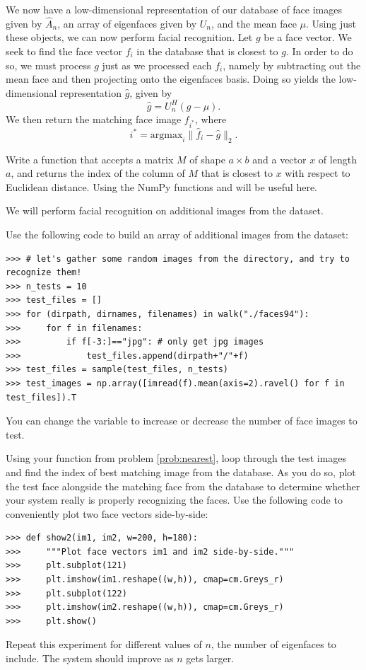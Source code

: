 We now have a low-dimensional representation of our database of face images given by $\hat{A}_n$, an array of eigenfaces given by $U_n$,
and the mean face $\mu$. Using just these objects, we can now perform facial recognition.
Let $g$ be a face vector.
We seek to find the face vector $f_i$ in the database that is closest to $g$.
In order to do so, we must process $g$ just as we processed each $f_i$, namely by subtracting out the mean face and then projecting onto the
eigenfaces basis.
Doing so yields the low-dimensional representation $\hat{g}$, given by
\[
\hat{g} = U_n^H(g-\mu).
\]
We then return the matching face image $f_{i^*}$, where
\[
i^* = \text{argmax}_i \|\hat{f}_i - \hat{g}\|_2.
\]
\begin{problem}
\label{prob:nearest}
Write a function  that accepts a matrix $M$ of shape $a \times b$ and a vector $x$
of length $a$, and returns the index of the column of $M$ that is closest to $x$ with respect to Euclidean distance.
Using the NumPy functions  and  will be useful here.
\end{problem}

\begin{problem}
\label{prob:match}
We will perform facial recognition on additional images from the  dataset.


Use the following code to build an array of additional images from the dataset:
\begin{lstlisting}
>>> # let's gather some random images from the directory, and try to recognize them!
>>> n_tests = 10
>>> test_files = []
>>> for (dirpath, dirnames, filenames) in walk("./faces94"):
>>>     for f in filenames:
>>>         if f[-3:]=="jpg": # only get jpg images
>>>             test_files.append(dirpath+"/"+f)
>>> test_files = sample(test_files, n_tests)
>>> test_images = np.array([imread(f).mean(axis=2).ravel() for f in test_files]).T
\end{lstlisting}
You can change the variable  to increase or decrease the number of face images to test.

Using your function  from problem \ref{prob:nearest}, loop through the test images and find
the index of best matching image from the database.
As you do so, plot the test face alongside the matching face from the database to determine whether your system
really is properly recognizing the faces.
Use the following code to conveniently plot two face vectors side-by-side:
\begin{lstlisting}
>>> def show2(im1, im2, w=200, h=180):
>>>     """Plot face vectors im1 and im2 side-by-side."""
>>>     plt.subplot(121)
>>>     plt.imshow(im1.reshape((w,h)), cmap=cm.Greys_r)
>>>     plt.subplot(122)
>>>     plt.imshow(im2.reshape((w,h)), cmap=cm.Greys_r)
>>>     plt.show()
\end{lstlisting}

Repeat this experiment for different values of $n$, the number of eigenfaces to include.
The system should improve as $n$ gets larger.
\end{problem}

